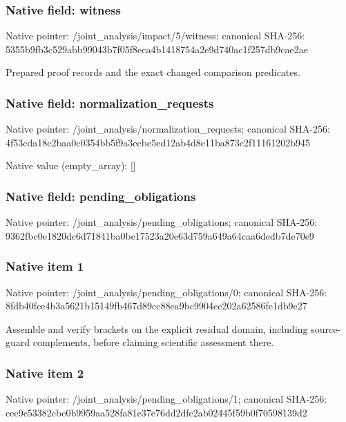 \documentclass[10pt,a4paper]{article}
\begin{document}
\subsubsection{Native field: witness}
Native pointer: /joint\_\allowbreak{}analysis/impact/5/witness; canonical SHA-256: 5355b9fb3c529abb99043b7f05f8eca4b1418754a2e9d740ac1f257db9cae2ae

\begingroup\raggedright\sloppy Prepared proof records and the exact changed comparison predicates.\par\endgroup

\subsubsection{Native field: normalization\_\allowbreak{}requests}
Native pointer: /joint\_\allowbreak{}analysis/normalization\_\allowbreak{}requests; canonical SHA-256: 4f53cda18c2baa0c0354bb5f9a3ecbe5ed12ab4d8e11ba873c2f11161202b945

Native value (empty\_\allowbreak{}array): []

\subsubsection{Native field: pending\_\allowbreak{}obligations}
Native pointer: /joint\_\allowbreak{}analysis/pending\_\allowbreak{}obligations; canonical SHA-256: 9362fbc0e1820dc6d71841ba0be17523a20e63d759a649a64caa6dedb7de70e9

\subsubsection{Native item 1}
Native pointer: /joint\_\allowbreak{}analysis/pending\_\allowbreak{}obligations/0; canonical SHA-256: 8fdb40fce4b3a5621b15149fb467d89cc88ea9bc9904cc202a62586fe1db9e27

\begingroup\raggedright\sloppy Assemble and verify brackets on the explicit residual domain,\allowbreak{} including source-guard complements,\allowbreak{} before claiming scientific assessment there.\par\endgroup

\subsubsection{Native item 2}
Native pointer: /joint\_\allowbreak{}analysis/pending\_\allowbreak{}obligations/1; canonical SHA-256: cee9c53382cbe0b9959aa528fa81c37e76dd2dfc2ab02445f59b0f70598139d2
\end{document}
